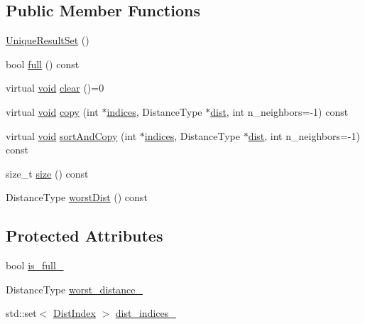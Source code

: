 \subsection*{Public Member Functions}
\begin{DoxyCompactItemize}
\item 
\hyperlink{classcvflann_1_1UniqueResultSet_a593b507d0e36a01562b3b501ccb3e846}{Unique\-Result\-Set} ()
\item 
bool \hyperlink{classcvflann_1_1UniqueResultSet_a6be2e327fabb1e4e62f08f9f746fd6ba}{full} () const 
\item 
virtual \hyperlink{legacy_8hpp_a8bb47f092d473522721002c86c13b94e}{void} \hyperlink{classcvflann_1_1UniqueResultSet_ad0f6df2b89548ce26bbdfa398436a3e7}{clear} ()=0
\item 
virtual \hyperlink{legacy_8hpp_a8bb47f092d473522721002c86c13b94e}{void} \hyperlink{classcvflann_1_1UniqueResultSet_a0d41e712bb5dff2dcf139f028df7d0f5}{copy} (int $\ast$\hyperlink{legacy_8hpp_a3e3b9b48bcbc7f460efbcfe4399ad24a}{indices}, Distance\-Type $\ast$\hyperlink{legacy_8hpp_ae895c2003a87eda49126845b7ac3688e}{dist}, int n\-\_\-neighbors=-\/1) const 
\item 
virtual \hyperlink{legacy_8hpp_a8bb47f092d473522721002c86c13b94e}{void} \hyperlink{classcvflann_1_1UniqueResultSet_afe9a25c34986cfa96a8e0032eab8c817}{sort\-And\-Copy} (int $\ast$\hyperlink{legacy_8hpp_a3e3b9b48bcbc7f460efbcfe4399ad24a}{indices}, Distance\-Type $\ast$\hyperlink{legacy_8hpp_ae895c2003a87eda49126845b7ac3688e}{dist}, int n\-\_\-neighbors=-\/1) const 
\item 
size\-\_\-t \hyperlink{classcvflann_1_1UniqueResultSet_a0acead6bdc4edc8847d9b809ff433cb4}{size} () const 
\item 
Distance\-Type \hyperlink{classcvflann_1_1UniqueResultSet_af626aa35c3c2821b769ecec88d7c249f}{worst\-Dist} () const 
\end{DoxyCompactItemize}
\subsection*{Protected Attributes}
\begin{DoxyCompactItemize}
\item 
bool \hyperlink{classcvflann_1_1UniqueResultSet_af71a1c29b71e041b32dd1007db3418ff}{is\-\_\-full\-\_\-}
\item 
Distance\-Type \hyperlink{classcvflann_1_1UniqueResultSet_ae4aeffc73377b192786837dd7a3360ab}{worst\-\_\-distance\-\_\-}
\item 
std\-::set$<$ \hyperlink{structcvflann_1_1UniqueResultSet_1_1DistIndex}{Dist\-Index} $>$ \hyperlink{classcvflann_1_1UniqueResultSet_a72cd438bad9e7924742ba2b7437a199b}{dist\-\_\-indices\-\_\-}
\end{DoxyCompactItemize}


